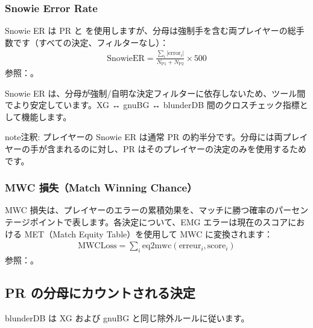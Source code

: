 \documentclass[letterpaper,10pt,dvipdfmx]{sphinxmanual}
\begin{document}
\subsubsection{Snowie Error Rate}
\label{\detokenize{stats_parity:snowie-error-rate}}
\sphinxAtStartPar
Snowie ER は PR と  を使用しますが、分母は強制手を含む両プレイヤーの総手数です（すべての決定、フィルターなし）：
\begin{equation*}
\begin{split}\mathrm{SnowieER} = \frac{\sum_i |\mathrm{error}_i|}{N_\text{P1} + N_\text{P2}} \times 500\end{split}
\end{equation*}
\sphinxAtStartPar
参照：。

\sphinxAtStartPar
Snowie ER は、分母が強制/自明な決定フィルターに依存しないため、ツール間でより安定しています。XG ↔ gnuBG ↔ blunderDB 間のクロスチェック指標として機能します。

\begin{sphinxadmonition}{note}{注釈:}
\sphinxAtStartPar
プレイヤーの Snowie ER は通常 PR の約半分です。分母には両プレイヤーの手が含まれるのに対し、PR はそのプレイヤーの決定のみを使用するためです。
\end{sphinxadmonition}


\subsubsection{MWC 損失（Match Winning Chance）}
\label{\detokenize{stats_parity:perte-mwc-match-winning-chance}}
\sphinxAtStartPar
MWC 損失は、プレイヤーのエラーの累積効果を、マッチに勝つ確率のパーセンテージポイントで表します。各決定について、EMG エラーは現在のスコアにおける MET（Match Equity Table）を使用して MWC に変換されます：
\begin{equation*}
\begin{split}\mathrm{MWCLoss} = \sum_i \mathrm{eq2mwc}(\mathrm{erreur}_i, \mathrm{score}_i)\end{split}
\end{equation*}
\sphinxAtStartPar
参照：。


\subsection{PR の分母にカウントされる決定}
\label{\detokenize{stats_parity:decisions-comptees-au-denominateur-du-pr}}
\sphinxAtStartPar
blunderDB は XG および gnuBG と同じ除外ルールに従います。
\end{document}
